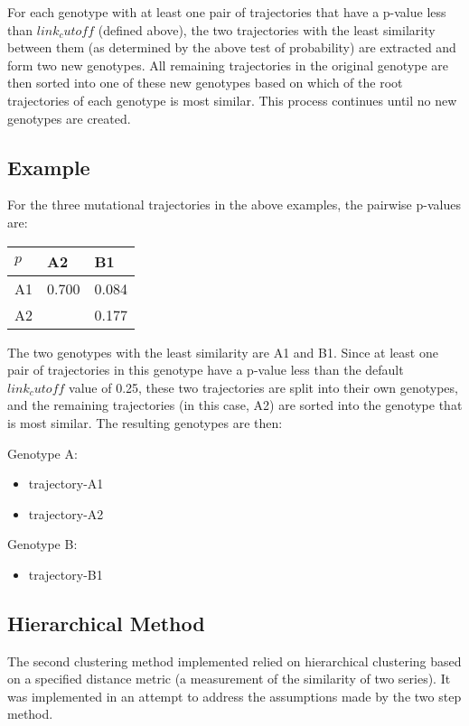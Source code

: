 \documentclass{report}
\begin{document}
For each genotype with at least one pair of trajectories that have a p-value less than $link_cutoff$ (defined above), 
the two trajectories with the least similarity between them (as determined by the above test of probability) are extracted and form two new genotypes. 
All remaining trajectories in the original genotype are then sorted into one of these new genotypes based on which of the root trajectories of each genotype is 
most similar. This process continues until no new genotypes are created.

\subsection{Example}

For the three mutational trajectories in the above examples, the pairwise p-values are:
\begin{tabular}{l|ll}
 $p$ & A2 & B1 \\
\hline
A1 & 0.700 & 0.084 \\
A2 &       & 0.177 \\
\end{tabular}

The two genotypes with the least similarity are A1 and B1. Since at least one pair of trajectories in this genotype have a p-value less than the default $link_cutoff$ value of 0.25, these two trajectories are split into their own genotypes, and the remaining trajectories (in this case, A2) are sorted into the genotype that is most similar. The resulting genotypes are then:

Genotype A:
\begin{itemize}
\item trajectory-A1
\item trajectory-A2
\end{itemize}

Genotype B:
\begin{itemize}
\item trajectory-B1
\end{itemize}

\subsection{Hierarchical Method}
The second clustering method implemented relied on hierarchical clustering based on a specified distance metric (a measurement of the similarity of two series). It was implemented in an attempt to address the assumptions made by the two step method.
\end{document}
